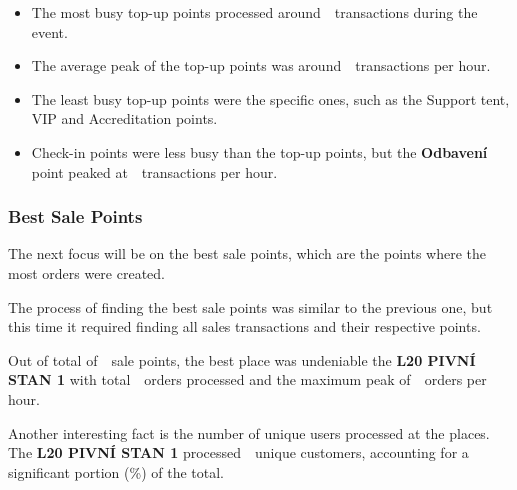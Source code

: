 \begin{keytakeaways}
	\begin{itemize}
		\item The most busy top-up points processed around~~transactions during the event.
		\item The average peak of the top-up points was around~~transactions per hour.
		\item The least busy top-up points were the specific ones, such as the Support tent, VIP and Accreditation points.
		\item Check-in points were less busy than the top-up points, but the \textbf{Odbavení} point peaked at~~transactions per hour.
	\end{itemize}
\end{keytakeaways}


\subsubsection{Best Sale Points}
\label{subsubsec:analysis-best-sale-points}

The next focus will be on the best sale points, which are the points where the most orders were created.


The process of finding the best sale points was similar to the previous one, but this time it required finding all sales transactions and their respective points.

Out of total of~~sale points, the best place was undeniable the \textbf{L20 PIVNÍ STAN 1} with total~~orders processed and the maximum peak of~~orders per hour.

Another interesting fact is the number of unique users processed at the places.
The \textbf{L20 PIVNÍ STAN 1} processed~~unique customers, accounting for a significant portion (\%) of the total.


